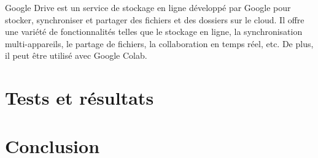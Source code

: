 Google Drive est un service de stockage en ligne développé par Google pour stocker, synchroniser et partager des fichiers et des dossiers sur le cloud. Il offre une variété de fonctionnalités telles que le stockage en ligne, la synchronisation multi-appareils, le partage de fichiers, la collaboration en temps réel, etc. De plus, il peut être utilisé avec Google Colab.

\section{Tests et résultats}

\section{Conclusion}

